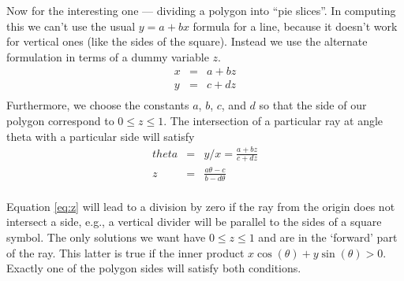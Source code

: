 \documentclass{article}
\begin{document}
Now for the interesting one --- dividing a polygon into ``pie slices''.
In computing this we can't use the usual $y= a + bx$ formula for a line,
because it doesn't work for vertical ones (like the sides of the square).
Instead we use the alternate formulation in terms of a dummy variable 
$z$.
\begin{eqnarray*}
  x &=& a + bz \\
  y &=& c + dz \\
\end{eqnarray*}
Furthermore, we choose the constants $a$, $b$, $c$, and $d$ so that 
the side of our polygon correspond to $0 \le z \le 1$.
The intersection of a particular ray at angle theta with a 
particular side will satisfy
\begin{eqnarray}
  theta &=& y/x = \frac{a + bz}{c+dz} \nonumber \\
  z &=& \frac{a\theta -c}{b - d\theta} \label{eq:z} \\
\end{eqnarray}

Equation \ref{eq:z} will lead to a division by zero if the ray from the
origin does not intersect a side, e.g., a vertical divider will be parallel
to the sides of a square symbol.  The only solutions we want have
$0 \le z \le 1$ and are in the `forward' part of the ray.  This latter  %
is true if the inner product $x \cos(\theta) + y \sin(\theta) >0$.
Exactly one of the polygon sides will satisfy both conditions.

\end{document}
